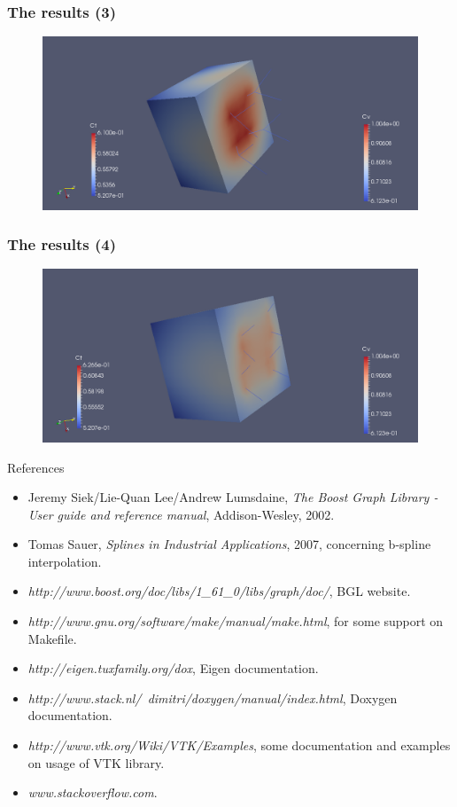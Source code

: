 \documentclass[11pt]{beamer}
\begin{document}
	\begin{frame}
		\frametitle{The results (3)}
		\begin{figure}[!h]
			\centering
			\includegraphics[width=0.9\linewidth]{ct2}
			\label{fig:ct2}
		\end{figure}
	\end{frame}
	
	\begin{frame}
		\frametitle{The results (4)}	
		\begin{figure}[!h]
			\centering
			\includegraphics[width=0.9\linewidth]{ct3}
			\label{fig:ct3}
		\end{figure}
	\end{frame}

	\begin{frame}{References}
		\begin{itemize}
			\item Jeremy Siek/Lie-Quan Lee/Andrew Lumsdaine, \textit{The Boost Graph Library - User guide and reference manual}, Addison-Wesley, 2002.
			\item Tomas Sauer, \textit{Splines in Industrial Applications}, 2007, concerning b-spline interpolation.
			\item \textit{http://www.boost.org/doc/libs/1\_61\_0/libs/graph/doc/}, BGL website.
			\item \textit{http://www.gnu.org/software/make/manual/make.html}, for some support on Makefile.
			\item \textit{http://eigen.tuxfamily.org/dox}, Eigen documentation.
			\item \textit{http://www.stack.nl/~dimitri/doxygen/manual/index.html}, Doxygen documentation.
			\item \textit{http://www.vtk.org/Wiki/VTK/Examples}, some documentation and examples on usage of VTK library.
			\item \textit{www.stackoverflow.com}.
		\end{itemize}
	\end{frame}
\end{document}
